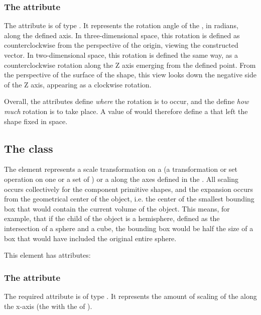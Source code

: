 \subsubsection{The \fixttspace{} attribute}
The  attribute is of type . It represents the rotation angle of the \CSGNode, in radians, along the defined axis.  In three-dimensional space, this rotation is defined as counterclockwise from the perspective of the origin, viewing the constructed vector.  In two-dimensional space, this rotation is defined the same way, as a counterclockwise rotation along the Z axis emerging from the defined point.  From the perspective of the surface of the shape, this view looks down the negative side of the Z axis, appearing as a clockwise rotation.

Overall, the  attributes define \emph{where} the rotation is to occur, and the  define \emph{how much} rotation is to take place.  A  value of  would therefore define a \CSGRotation that left the shape fixed in space.


\subsection{The  class}
\label{csgscale-class}
The \CSGScale element represents a scale transformation on a \CSGNode (a transformation or set operation on one or a set of \CSGPrimitives) or a \CSGPrimitive along the axes defined in the \Geometry.  All scaling occurs collectively for the component primitive shapes, and the expansion occurs from the geometrical center of the object, i.e. the center of the smallest bounding box that would contain the current volume of the object.  This means, for example, that if the child of the \CSGScale object is a hemisphere, defined as the intersection of a sphere and a cube, the bounding box would be half the size of a box that would have included the original entire sphere.

This element has  attributes:

\subsubsection{The \fixttspace{} attribute}
The  required attribute is of type . It represents the amount of scaling of the \CSGNode along the x-axis (the \CoordinateComponent with the  of ).

